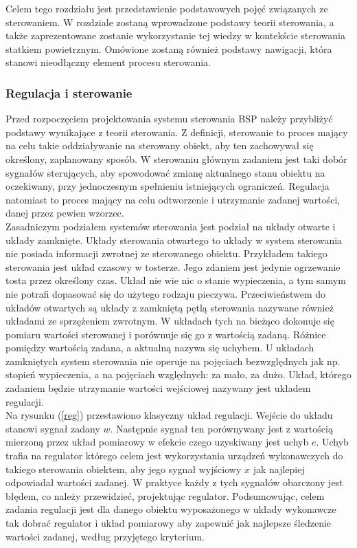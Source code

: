 Celem tego rozdziału jest przedstawienie podstawowych pojęć związanych ze sterowaniem. W rozdziale zostaną wprowadzone podstawy teorii sterowania, a także zaprezentowane zostanie wykorzystanie tej wiedzy w kontekście sterowania statkiem powietrznym. Omówione zostaną również podstawy nawigacji, która stanowi nieodłączny element procesu sterowania.

\subsubsection{Regulacja i sterowanie}

Przed rozpoczęciem projektowania systemu sterowania BSP należy przybliżyć podstawy wynikające z teorii sterowania. Z definicji, sterowanie to proces mający na celu takie oddziaływanie na sterowany obiekt, aby ten zachowywał się określony, zaplanowany sposób. W sterowaniu głównym zadaniem jest taki dobór sygnałów sterujących, aby spowodować zmianę aktualnego stanu obiektu na oczekiwany, przy jednoczesnym spełnieniu istniejących ograniczeń. Regulacja natomiast to proces mający na celu odtworzenie i utrzymanie zadanej wartości, danej przez pewien wzorzec.\\

Zasadniczym podziałem systemów sterowania jest podział na układy otwarte i układy zamknięte. Układy sterowania otwartego to układy w system sterowania nie posiada informacji zwrotnej ze sterowanego obiektu. Przykładem takiego sterowania jest układ czasowy w tosterze. Jego zdaniem jest jedynie ogrzewanie tosta przez określony czas. Układ nie wie nic o stanie wypieczenia, a tym samym nie potrafi dopasować się do użytego rodzaju pieczywa. Przeciwieństwem do układów otwartych są układy z zamkniętą pętlą sterowania nazywane również układami ze sprzężeniem zwrotnym. W układach tych na bieżąco dokonuje się pomiaru wartości sterowanej i porównuje się go z wartością zadaną. Różnice pomiędzy wartością zadana, a aktualną nazywa się uchybem. U układach zamkniętych system sterowania nie operuje na pojęciach bezwzględnych jak np. stopień wypieczenia, a na pojęciach względnych: za mało, za dużo. Układ, którego zadaniem będzie utrzymanie wartości wejściowej nazywany jest układem regulacji.\\

Na rysunku (\ref{reg}) przestawiono klasyczny układ regulacji.  Wejście do układu stanowi sygnał zadany $w$. Następnie sygnał ten porównywany jest z wartością mierzoną przez układ pomiarowy w efekcie czego uzyskiwany jest uchyb $e$. Uchyb trafia na regulator którego celem jest wykorzystania urządzeń wykonawczych do takiego sterowania obiektem, aby jego sygnał wyjściowy $x$ jak najlepiej odpowiadał wartości zadanej. W praktyce każdy z tych sygnałów obarczony jest błędem, co należy przewidzieć, projektując regulator. Podsumowując, celem zadania regulacji jest dla danego obiektu wyposażonego w układy wykonawcze tak dobrać regulator i układ pomiarowy aby zapewnić jak najlepsze śledzenie wartości zadanej, według przyjętego kryterium.

